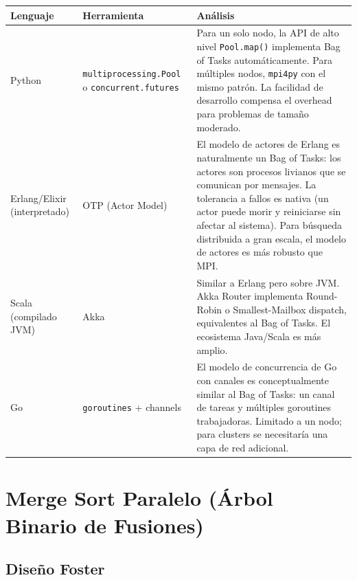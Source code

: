 \documentclass[12pt,a4paper]{article}
\begin{document}
\begin{longtable}{L{2.5cm} L{3.5cm} L{7.5cm}}
\toprule
\textbf{Lenguaje} & \textbf{Herramienta} & \textbf{Análisis} \\
\midrule
\endhead
Python & \texttt{multiprocessing.Pool} o \texttt{concurrent.futures} &
  Para un solo nodo, la API de alto nivel \texttt{Pool.map()} implementa
  Bag of Tasks automáticamente. Para múltiples nodos, \texttt{mpi4py} con
  el mismo patrón. La facilidad de desarrollo compensa el overhead para
  problemas de tamaño moderado. \\[4pt]
Erlang/Elixir (interpretado) & OTP (Actor Model) & El modelo de actores de
  Erlang es naturalmente un Bag of Tasks: los actores son procesos livianos
  que se comunican por mensajes. La tolerancia a fallos es nativa (un actor
  puede morir y reiniciarse sin afectar al sistema). Para búsqueda distribuida
  a gran escala, el modelo de actores es más robusto que MPI. \\[4pt]
Scala (compilado JVM) & Akka & Similar a Erlang pero sobre JVM. Akka Router
  implementa Round-Robin o Smallest-Mailbox dispatch, equivalentes al Bag of
  Tasks. El ecosistema Java/Scala es más amplio. \\[4pt]
Go & \texttt{goroutines} + channels & El modelo de concurrencia de Go con
  canales es conceptualmente similar al Bag of Tasks: un canal de tareas
  y múltiples goroutines trabajadoras. Limitado a un nodo; para clusters
  se necesitaría una capa de red adicional. \\
\bottomrule
\end{longtable}

\newpage

\section{Merge Sort Paralelo (Árbol Binario de Fusiones)}

\subsection{Diseño Foster}
\end{document}
